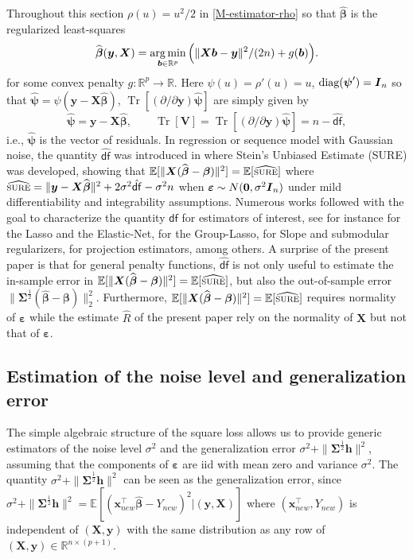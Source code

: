 \documentclass[11pt]{amsart}
\numberwithin{equation}{section}
\numberwithin{equation}{section}
\def\argmin{\mathop{\rm arg\, min}}
\def\argmin{\mathop{\rm arg\, min}}
\def\real{{\mathbb{R}}}
\def\R{{\real}}
\def\E{{\mathbb{E}}}
\def\diag{\hbox{\rm diag}}
\DeclareMathOperator{\trace}{Tr}
\def\mathbold{\boldsymbol} %
\def\bb{\mathbold{b}}\def\bhat{\widehat{b}}\def\btil{\widetilde{b}}
\def\bh{\mathbold{h}}\def\hhat{\widehat{h}}\def\htil{\widetilde{h}}
\def\bI{\mathbold{I}}\def\hbI{{\widehat{\bI}}}\def\tbI{{\widetilde{\bI}}}
\def\bV{\mathbold{V}}\def\hbV{{\widehat{\bV}}}\def\tbV{{\widetilde{\bV}}}
\def\bx{\mathbold{x}}\def\xhat{\widehat{x}}\def\xtil{\widetilde{x}}\def\xbar{{\overline x}}\def\vbx{{\bf x}}
\def\bX{\mathbold{X}}\def\hbX{{\widehat{\bX}}}\def\tbX{{\widetilde{\bX}}}\def\bXbar{{\overline \bX}}
\def\by{\mathbold{y}}\def\yhat{\widehat{y}}\def\ytil{\widetilde{y}}\def\ybar{{\overline y}}\def\vby{{\bf y}}
\def\bbeta{\mathbold{\beta}}\def\betahat{\widehat{\beta}}\def\hbeta{\widehat{\beta}}
\def\hbbeta{{{\widehat{\bbeta}}}}
\def\ep{\varepsilon}\def\eps{\epsilon}\def\veps{\varepsilon}
\def\bep{ {\mathbold{\ep} }}
\def\bSigma{\mathbold{\Sigma}}\def\hbSigma{{\widehat{\bSigma}}}
\def\bpsi{\mathbold{\psi}}\def\psihat{\widehat{\psi}}\def\hpsi{\widehat{\psi}}
\def\hbpsi{{\widehat{\bpsi}}}\def\tbpsi{{\widetilde{\bpsi}}}
\def\argmin{\mathop{\rm arg\, min}}
\def\SURE{\widehat{\rm{\scriptstyle SURE}}}
\def\df{{\hat{\mathsf{df}}}{}}
\begin{document}
Throughout this section $\rho(u)=u^2/2$ in \eqref{M-estimator-rho}
so that $\hbbeta$ is the regularized least-squares
\begin{equation}
    \hbbeta(\by,\bX) = \argmin_{\bb\in\R^p}
    \Big(
        \|\bX \bb - \by\|^2/(2n)
        + g(\bb)
    \Big).
    \label{hbbeta-squared-loss}
\end{equation}
for some convex penalty $g:\R^p\to\R$.
Here $\psi(u)=\rho'(u)=u$, $\diag(\bpsi')=\bI_n$ so that
$\hbpsi=\psi(\by-\bX\hbbeta)$,
$\trace[(\partial/\partial\by)\hbpsi]$ are simply given by
$$\hbpsi = \by-\bX\hbbeta,
\qquad
\trace[\bV]=\trace[(\partial/\partial\by)\hbpsi] = n -\df,
$$
i.e., $\hbpsi$ is the vector of residuals.
In regression or sequence model with Gaussian noise,
the quantity $\df$ was introduced in
\cite{stein1981estimation} where Stein's Unbiased Estimate (SURE) was developed,
showing that
$\E[\|\bX(\hbbeta-\bbeta)\|^2] = \E[\SURE]$
 where 
$\SURE= \|\by-\bX\hbbeta\|^2 + 2\sigma^2\df - \sigma^2 n$
when $\bep\sim N({\bf 0},\sigma^2\bI_n)$
under mild differentiability and integrability assumptions.
Numerous works followed with the goal to characterize
the quantity $\df$ for estimators of interest, see for instance
\cite{zou2007,tibshirani2012,kato2009degrees,dossal2013degrees}
for the Lasso and the Elastic-Net,
\cite{vaiter2012degrees} for the Group-Lasso,
\cite{minami2020degrees} for Slope and submodular regularizers,
\cite{chen2019degrees} for projection estimators,
among others.
A surprise of the present paper
is that for general penalty functions, $\df$ is not only useful to estimate
the in-sample error in
$\E[\|\bX(\hbbeta-\bbeta)\|^2] = \E[\SURE]$, but also
the out-of-sample error
$\|\bSigma^{\frac12}(\hbbeta-\bbeta)\|_2^2$.
Furthermore, 
$\E[\|\bX(\hbbeta-\bbeta)\|^2] = \E[\SURE]$
 requires normality
of $\bep$ while the estimate $\hat R$ of the present paper rely
on the normality of $\bX$ but not that of $\bep$.

\subsection{Estimation of the noise level and generalization error}

The simple algebraic structure of the square loss allows us
to provide generic estimators of the noise level $\sigma^2$ and the generalization
error 
$\sigma^2 + \|\bSigma^{\frac12}\bh\|^2$,
assuming that the components of $\bep$ are iid
with mean zero and variance $\sigma^2$.
The quantity $\sigma^2 + \|\bSigma^{\frac12}\bh\|^2$ can be seen
as the generalization error, since 
$\sigma^2 + \|\bSigma^{\frac12}\bh\|^2 = \E[(\bx_{new}^\top\hbbeta - Y_{new})^2| (\by,\bX)]$
where $(\bx_{new}^\top,Y_{new})$ is independent of $(\bX,\by)$
with the same distribution as any row of $(\bX,\by)\in\R^{n\times (p+1)}$.
\end{document}
